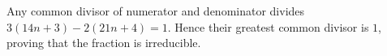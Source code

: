 Any common divisor of numerator and denominator divides $3(14n+3)-2(21n+4)=1$. Hence their greatest common divisor is $1$, proving that the fraction is irreducible.
